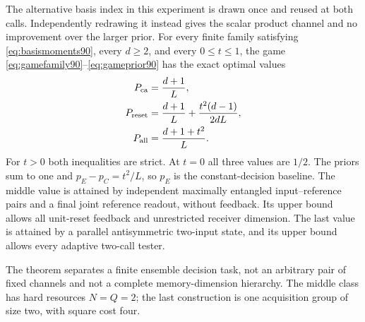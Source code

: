 \begin{theorem}\label{thm:operationalhierarchy90}
The alternative basis index in this experiment is drawn once and
reused at both calls.  Independently redrawing it instead gives the
scalar product channel and no improvement over the larger prior.
For every finite family satisfying \eqref{eq:basismoments90}, every
$d\ge2$, and every $0\le t\le1$, the game \eqref{eq:gamefamily90}--\eqref{eq:gameprior90}
has the exact optimal values
\begin{equation}\label{eq:operationalhierarchy90}
\begin{split}
 P_{\rm ca}&=\frac{d+1}{L},\\
 P_{\rm reset}&=\frac{d+1}{L}+\frac{t^2(d-1)}{2dL},\\
 P_{\rm all}&=\frac{d+1+t^2}{L}.
\end{split}
\end{equation}
For $t>0$ both inequalities are strict.  At $t=0$ all three
values are $1/2$.  The priors sum to one and
$p_E-p_C=t^2/L$, so $p_E$ is the constant-decision baseline.
The middle value is attained
by independent maximally entangled input--reference pairs and a final
joint reference readout, without feedback.  Its upper bound allows all
unit-reset feedback and unrestricted receiver dimension.  The last
value is attained by a parallel antisymmetric two-input state, and its
upper bound allows every adaptive two-call tester.
\end{theorem}
The theorem separates a finite ensemble decision task, not an arbitrary
pair of fixed channels and not a complete memory-dimension hierarchy.
The middle class has hard resources $N=Q=2$; the last construction is
one acquisition group of size two, with square cost four.

